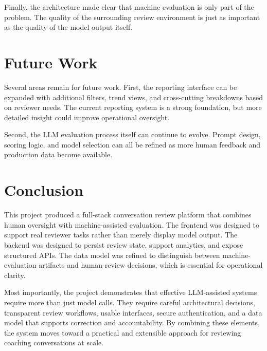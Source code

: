 \documentclass[12pt]{article}
\begin{document}
	Finally, the architecture made clear that machine evaluation is only part of the problem. The quality of the surrounding review environment is just as important as the quality of the model output itself.
	
	\section{Future Work}
	
	Several areas remain for future work. First, the reporting interface can be expanded with additional filters, trend views, and cross-cutting breakdowns based on reviewer needs. The current reporting system is a strong foundation, but more detailed insight could improve operational oversight.
	
	Second, the LLM evaluation process itself can continue to evolve. Prompt design, scoring logic, and model selection can all be refined as more human feedback and production data become available.
	
	\section{Conclusion}
	
	This project produced a full-stack conversation review platform that combines human oversight with machine-assisted evaluation. The frontend was designed to support real reviewer tasks rather than merely display model output. The backend was designed to persist review state, support analytics, and expose structured APIs. The data model was refined to distinguish between machine-evaluation artifacts and human-review decisions, which is essential for operational clarity.
	
	Most importantly, the project demonstrates that effective LLM-assisted systems require more than just model calls. They require careful architectural decisions, transparent review workflows, usable interfaces, secure authentication, and a data model that supports correction and accountability. By combining these elements, the system moves toward a practical and extensible approach for reviewing coaching conversations at scale.
	
\end{document}
